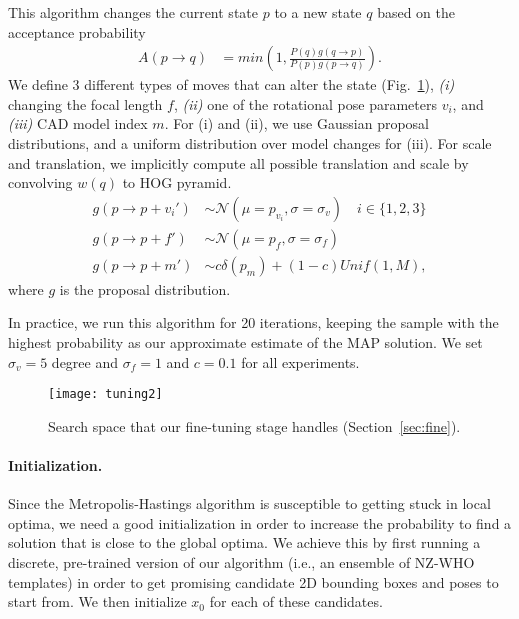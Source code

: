 This algorithm changes the current state $p$ to a new state $q$ based
on the acceptance probability
\begin{align}
    A(p \rightarrow q) & =  min\left( 1,  \frac{P(q) g(q \rightarrow p)}{P(p) g(p \rightarrow q)}\right).
\end{align}
We define $3$ different types of moves that can alter the state
(Fig.~\ref{fig:moves}), {\em (i)} changing the focal length $f$, {\em
(ii)} one of the rotational pose parameters $v_i$, and {\em (iii)} CAD model
index $m$. For (i) and (ii), we use Gaussian proposal distributions, and a uniform
distribution over model changes for (iii). For scale and translation, we
implicitly compute all possible translation and scale by convolving $w(q)$ to
HOG pyramid.
\begin{align}
    g(p \rightarrow p + v_i') & \sim \mathcal{N}(\mu = p_{v_i},\sigma = \sigma_v) \quad i \in \{1,2,3\}\\
    g(p \rightarrow p + f') & \sim \mathcal{N}(\mu = p_{f},\sigma = \sigma_f)\\
    g(p \rightarrow p + m') & \sim c \delta(p_m) + (1-c) Unif(1,M),
\end{align}
where $g$ is the proposal distribution. %
%

In practice, we run this algorithm for 20 iterations, keeping
the sample with the highest probability as our approximate estimate of
the MAP solution. We set $\sigma_v = 5$ degree and $\sigma_f = 1$ and
$c = 0.1$ for all experiments.

\begin{figure}[t]
\centering
    \texttt{[image: tuning2]} \\ [-5pt]
    \caption{Search space that our fine-tuning stage handles (Section~\ref{sec:fine}).}
 \label{fig:moves}
\end{figure}


\paragraph{Initialization.}
Since the Metropolis-Hastings algorithm is susceptible to getting
stuck in local optima, we need a good initialization in order to
increase the probability to find a solution that is close to the
global optima. We achieve this by first running a discrete,
pre-trained version of our algorithm (i.e., an ensemble of NZ-WHO
templates) in order to get promising candidate 2D bounding boxes and
poses to start from. We then initialize $x_0$ for each of these candidates.
